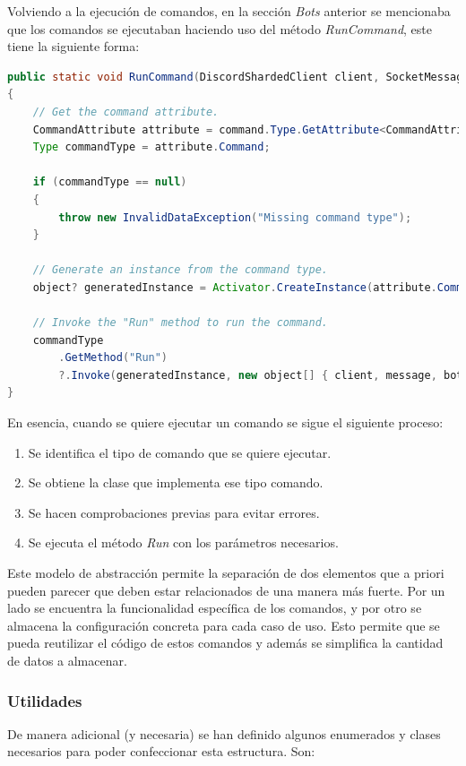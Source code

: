 Volviendo a la ejecución de comandos, en la sección \textit{Bots} anterior se mencionaba que los comandos se ejecutaban haciendo uso del método \textit{RunCommand}, este tiene la siguiente forma:

\begin{lstlisting}[language=java]
public static void RunCommand(DiscordShardedClient client, SocketMessage message, Bot bot, UserCommand command)
{
    // Get the command attribute.
    CommandAttribute attribute = command.Type.GetAttribute<CommandAttribute>();
    Type commandType = attribute.Command;

    if (commandType == null)
    {
        throw new InvalidDataException("Missing command type");
    }

    // Generate an instance from the command type.
    object? generatedInstance = Activator.CreateInstance(attribute.Command);

    // Invoke the "Run" method to run the command.
    commandType
        .GetMethod("Run")
        ?.Invoke(generatedInstance, new object[] { client, message, bot, command });
}
\end{lstlisting}

En esencia, cuando se quiere ejecutar un comando se sigue el siguiente proceso:

\begin{enumerate}
	\item Se identifica el tipo de comando que se quiere ejecutar.
	\item Se obtiene la clase que implementa ese tipo comando.
	\item Se hacen comprobaciones previas para evitar errores.
	\item Se ejecuta el método \textit{Run} con los parámetros necesarios.
\end{enumerate}

Este modelo de abstracción permite la separación de dos elementos que a priori pueden parecer que deben estar relacionados de una manera más fuerte. Por un lado se encuentra la funcionalidad específica de los comandos, y por otro se almacena la configuración concreta para cada caso de uso. Esto permite que se pueda reutilizar el código de estos comandos y además se simplifica la cantidad de datos a almacenar.


\subsubsection{Utilidades}

De manera adicional (y necesaria) se han definido algunos enumerados y clases necesarios para poder confeccionar esta estructura. Son:

